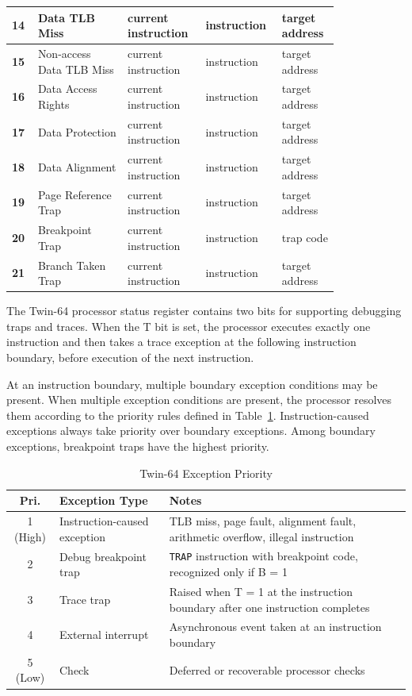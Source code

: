 \begin{longtable}{@{}p{0.075\linewidth}p{0.25\linewidth}p{0.2\linewidth}p{0.15\linewidth}p{0.15\linewidth}@{}}
    \textbf{14} & Data TLB Miss & current instruction & instruction & target address \\
    \midrule
    \textbf{15} & Non-access Data TLB Miss & current instruction & instruction & target address \\
    \midrule
    \textbf{16} & Data Access Rights & current instruction & instruction & target address \\
    \midrule
    \textbf{17} & Data Protection & current instruction & instruction & target address \\
    \midrule
    \textbf{18} & Data Alignment & current instruction & instruction & target address \\
    \midrule
    \textbf{19} & Page Reference Trap & current instruction & instruction & target address \\
    \midrule
    \textbf{20} & Breakpoint Trap & current instruction & instruction & trap code \\
    \midrule
    \textbf{21} & Branch Taken Trap & current instruction & instruction & target address \\
   \end{longtable}
   

The Twin-64 processor status register contains two bits for supporting debugging traps and traces. When the T bit is set, the processor executes exactly one instruction and then takes a trace exception at the following instruction boundary, before execution of the next instruction.

At an instruction boundary, multiple boundary exception conditions may be present. When multiple exception conditions are present, the processor resolves them according to the priority rules defined in Table~\ref{tab:exception-priority}. Instruction-caused exceptions always take priority over boundary exceptions. Among boundary exceptions, breakpoint traps have the highest priority.

\begin{table}[h]
\centering
\begin{tabularx}{\linewidth}{|c|l|X|}
\hline
\textbf{Pri.} & \textbf{Exception Type} & \textbf{Notes} \\
\hline
1 (High) & Instruction-caused exception &
TLB miss, page fault, alignment fault, arithmetic overflow, illegal instruction \\
\hline
2 & Debug breakpoint trap &
\texttt{TRAP} instruction with breakpoint code, recognized only if B = 1 \\
\hline
3 & Trace trap &
Raised when T = 1 at the instruction boundary after one instruction completes \\
\hline
4 & External interrupt &
Asynchronous event taken at an instruction boundary \\
\hline
5 (Low) & Check &
Deferred or recoverable processor checks \\
\hline
\end{tabularx}
\caption{Twin-64 Exception Priority}
\label{tab:exception-priority}
\end{table}


